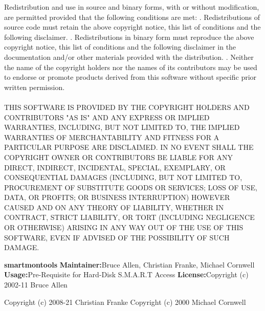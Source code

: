 \begin{addmargin}[4.5em]{0em}
    \fontsize{10pt}{12pt}\selectfont
    Redistribution and use in source and binary forms, with or without
    modification, are permitted provided that the following conditions
    are met:
    . Redistributions of source code must retain the above copyright
    notice, this list of conditions and the following disclaimer.
    . Redistributions in binary form must reproduce the above copyright
    notice, this list of conditions and the following disclaimer in the
    documentation and/or other materials provided with the distribution.
    . Neither the name of the copyright holders nor the names of its
    contributors may be used to endorse or promote products derived from
    this software without specific prior written permission.
    \\ \\
    \uppercase{THIS SOFTWARE IS PROVIDED BY THE COPYRIGHT HOLDERS AND CONTRIBUTORS "AS IS"
    AND ANY EXPRESS OR IMPLIED WARRANTIES, INCLUDING, BUT NOT LIMITED TO, THE
    IMPLIED WARRANTIES OF MERCHANTABILITY AND FITNESS FOR A PARTICULAR PURPOSE
    ARE DISCLAIMED. IN NO EVENT SHALL THE COPYRIGHT OWNER OR CONTRIBUTORS BE
    LIABLE FOR ANY DIRECT, INDIRECT, INCIDENTAL, SPECIAL, EXEMPLARY, OR
    CONSEQUENTIAL DAMAGES (INCLUDING, BUT NOT LIMITED TO, PROCUREMENT OF
    SUBSTITUTE GOODS OR SERVICES; LOSS OF USE, DATA, OR PROFITS; OR BUSINESS
    INTERRUPTION) HOWEVER CAUSED AND ON ANY THEORY OF LIABILITY, WHETHER IN
    CONTRACT, STRICT LIABILITY, OR TORT (INCLUDING NEGLIGENCE OR OTHERWISE)
    ARISING IN ANY WAY OUT OF THE USE OF THIS SOFTWARE, EVEN IF ADVISED OF
    THE POSSIBILITY OF SUCH DAMAGE.}
\end{addmargin}
\newpage
{\bfseries smartmontools}
\newline
\newline
{\bfseries Maintainer:}{\space Bruce Allen, Christian Franke, Michael Cornwell}
\newline
\newline
{\bfseries Usage:}{\space Pre-Requisite for Hard-Disk S.M.A.R.T Access}
\newline
\newline
{\bfseries License:}{\space Copyright (c) 2002-11 Bruce Allen}
\begin{addmargin}[4.45em]{0em}
    \space Copyright (c) 2008-21 Christian Franke \newline
    \space Copyright (c) 2000 Michael Cornwell \newline
\end{addmargin}
